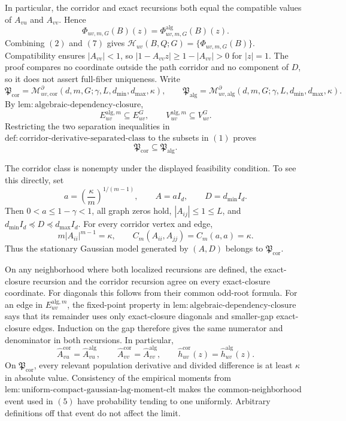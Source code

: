 In particular, the corridor and exact recursions both equal the compatible values of \(A_{vu}\) and \(A_{vv}\).  Hence
\[
 \Phi_{uv,m,G}(B)(z)
 =\Phi^{\mathrm{alg}}_{uv,m,G}(B)(z).
\tag{7}
\]
Combining \((2)\) and \((7)\) gives
\(\mathcal H_{uv}(B,Q;G)=\{\Phi_{uv,m,G}(B)\}\).  Compatibility ensures \(|A_{vv}|<1\), so \(|1-A_{vv}z|\ge1-|A_{vv}|>0\) for \(|z|=1\).  The proof compares no coordinate outside the path corridor and no component of \(D\), so it does not assert full-fiber uniqueness.
Write
\[
 \mathfrak P_{\mathrm{cor}}
 =\mathcal M_{uv,\mathrm{cor}}^{\partial}
 (d,m,G;\gamma,L,d_{\min},d_{\max},\kappa),
 \qquad
 \mathfrak P_{\mathrm{alg}}
 =\mathcal M_{uv,\mathrm{alg}}^{\partial}
 (d,m,G;\gamma,L,d_{\min},d_{\max},\kappa).
\]
By \(\mathrm{lem{:}algebraic\mbox{-}dependency\mbox{-}closure}\),
\[
 E_{uv}^{\mathrm{alg},m}\subseteq E_{uv}^{G},
 \qquad
 V_{uv}^{\mathrm{alg},m}\subseteq V_{uv}^{G}.
\tag{1}
\]
Restricting the two separation inequalities in \(\mathrm{def{:}corridor\mbox{-}derivative\mbox{-}separated\mbox{-}class}\) to the subsets in \((1)\) proves
\[
 \mathfrak P_{\mathrm{cor}}\subseteq\mathfrak P_{\mathrm{alg}}.
\tag{2}
\]

The corridor class is nonempty under the displayed feasibility condition.  To see this directly, set
\[
 a=\left(\frac{\kappa}{m}\right)^{1/(m-1)},
 \qquad A=aI_d,
 \qquad D=d_{\min}I_d.
\tag{3}
\]
Then \(0<a\le1-\gamma<1\), all graph zeros hold, \(|A_{ij}|\le1\le L\), and
\(d_{\min}I_d\preceq D\preceq d_{\max}I_d\).  For every corridor vertex and edge,
\[
 m|A_{ii}|^{m-1}=\kappa,
 \qquad
 C_m(A_{ii},A_{jj})=C_m(a,a)=\kappa.
\tag{4}
\]
Thus the stationary Gaussian model generated by \((A,D)\) belongs to \(\mathfrak P_{\mathrm{cor}}\).

On any neighborhood where both localized recursions are defined, the exact-closure recursion and the corridor recursion agree on every exact-closure coordinate.  For diagonals this follows from their common odd-root formula.  For an edge in \(E_{uv}^{\mathrm{alg},m}\), the fixed-point property in \(\mathrm{lem{:}algebraic\mbox{-}dependency\mbox{-}closure}\) says that its remainder uses only exact-closure diagonals and smaller-gap exact-closure edges.  Induction on the gap therefore gives the same numerator and denominator in both recursions.  In particular,
\[
 \widehat A_{vu}^{\mathrm{cor}}=\widehat A_{vu}^{\mathrm{alg}},
 \qquad
 \widehat A_{vv}^{\mathrm{cor}}=\widehat A_{vv}^{\mathrm{alg}},
 \qquad
 \widehat h_{uv}^{\mathrm{cor}}(z)=\widehat h_{uv}^{\mathrm{alg}}(z).
\tag{5}
\]
On \(\mathfrak P_{\mathrm{cor}}\), every relevant population derivative and divided difference is at least \(\kappa\) in absolute value.  Consistency of the empirical moments from \(\mathrm{lem{:}uniform\mbox{-}compact\mbox{-}gaussian\mbox{-}lag\mbox{-}moment\mbox{-}clt}\) makes the common-neighborhood event used in \((5)\) have probability tending to one uniformly.  Arbitrary definitions off that event do not affect the limit.

